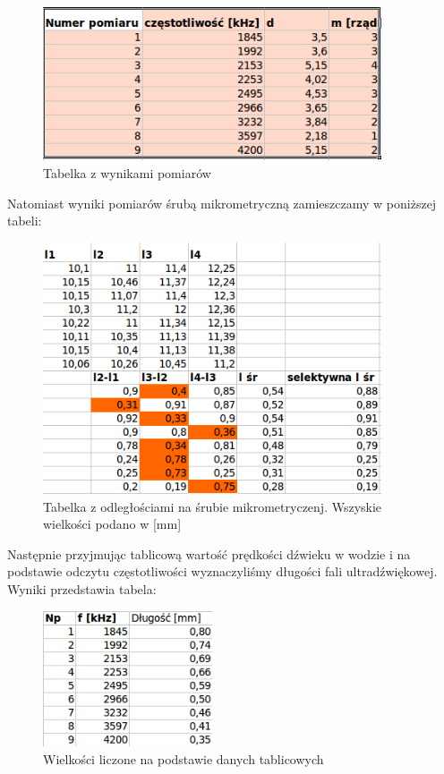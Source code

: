 \documentclass[a4paper,12pt]{article}
\begin{document}
\begin{figure} [H]
  \begin{center}
    \includegraphics[width = 10cm]{tab1.png}
    \caption{Tabelka z wynikami pomiarów}
  \end{center}
\end{figure}

Natomiast wyniki pomiarów śrubą mikrometryczną zamieszczamy w poniższej tabeli: 

\begin{figure} [H]
  \begin{center}
    \includegraphics[width = 10cm]{tab2.png}
    \caption{Tabelka z odległościami na śrubie mikrometryczenj. Wszyskie wielkości podano w [mm]}
  \end{center}
\end{figure}


Następnie przyjmując tablicową wartość prędkości dźwieku w wodzie i na podstawie odczytu częstotliwości wyznaczyliśmy długości fali ultradźwiękowej. Wyniki przedstawia tabela: 

\begin{figure} [H]
  \begin{center}
    \includegraphics[width = 5cm]{tab3.png}
    \caption{Wielkości liczone na podstawie danych tablicowych}
  \end{center}
\end{figure}
\end{document}
